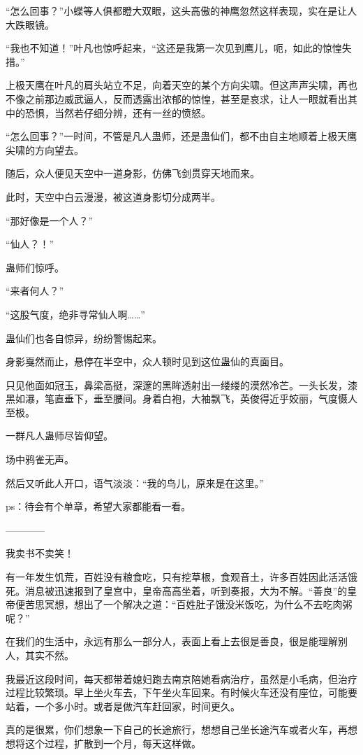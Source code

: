 \begin{this_body}
“怎么回事？”小蝶等人俱都瞪大双眼，这头高傲的神鹰忽然这样表现，实在是让人大跌眼镜。

“我也不知道！”叶凡也惊呼起来，“这还是我第一次见到鹰儿，呃，如此的惊惶失措。”

上极天鹰在叶凡的肩头站立不足，向着天空的某个方向尖啸。但这声声尖啸，再也不像之前那边威武逼人，反而透露出浓郁的惊惶，甚至是哀求，让人一眼就看出其中的恐惧，当然若仔细分辨，还有一丝的愤怒。

“怎么回事？”一时间，不管是凡人蛊师，还是蛊仙们，都不由自主地顺着上极天鹰尖啸的方向望去。

随后，众人便见天空中一道身影，仿佛飞剑贯穿天地而来。

此时，天空中白云漫漫，被这道身影切分成两半。

“那好像是一个人？”

“仙人？！”

蛊师们惊呼。

“来者何人？”

“这股气度，绝非寻常仙人啊……”

蛊仙们也各自惊异，纷纷警惕起来。

身影戛然而止，悬停在半空中，众人顿时见到这位蛊仙的真面目。

只见他面如冠玉，鼻梁高挺，深邃的黑眸透射出一缕缕的漠然冷芒。一头长发，漆黑如瀑，笔直垂下，垂至腰间。身着白袍，大袖飘飞，英俊得近乎姣丽，气度慑人至极。

一群凡人蛊师尽皆仰望。

场中鸦雀无声。

然后又听此人开口，语气淡淡：“我的鸟儿，原来是在这里。”

ps：待会有个单章，希望大家都能看一看。

------------

我卖书不卖笑！

有一年发生饥荒，百姓没有粮食吃，只有挖草根，食观音土，许多百姓因此活活饿死。消息被迅速报到了皇宫中，皇帝高高坐着，听到奏报，大为不解。“善良”的皇帝便苦思冥想，想出了一个解决之道：“百姓肚子饿没米饭吃，为什么不去吃肉粥呢？”

在我们的生活中，永远有那么一部分人，表面上看上去很是善良，很是能理解别人，其实不然。

我最近这段时间，每天都带着媳妇跑去南京陪她看病治疗，虽然是小毛病，但治疗过程比较繁琐。早上坐火车去，下午坐火车回来。有时候火车还没有座位，可能要站着，一个多小时。或者是做汽车赶回家，时间更久。

真的是很累，你们想象一下自己的长途旅行，想想自己坐长途汽车或者火车，再想想将这个过程，扩散到一个月，每天这样做。


\end{this_body}
